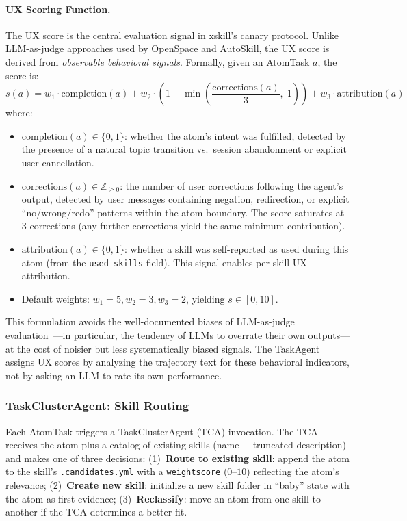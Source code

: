 \documentclass{article}
\begin{document}
\paragraph{UX Scoring Function.} The UX score is the central evaluation signal in xskill's canary protocol. Unlike LLM-as-judge approaches used by OpenSpace and AutoSkill, the UX score is derived from \emph{observable behavioral signals}. Formally, given an AtomTask $a$, the score is:
\begin{equation}
\label{eq:ux}
s(a) = w_1 \cdot \mathrm{completion}(a) + w_2 \cdot \left(1 - \min\!\left(\frac{\mathrm{corrections}(a)}{3},\; 1\right)\right) + w_3 \cdot \mathrm{attribution}(a)
\end{equation}
where:
\begin{itemize}
    \item $\mathrm{completion}(a) \in \{0, 1\}$: whether the atom's intent was fulfilled, detected by the presence of a natural topic transition vs.\ session abandonment or explicit user cancellation.
    \item $\mathrm{corrections}(a) \in \mathbb{Z}_{\geq 0}$: the number of user corrections following the agent's output, detected by user messages containing negation, redirection, or explicit ``no/wrong/redo'' patterns within the atom boundary. The score saturates at 3 corrections (any further corrections yield the same minimum contribution).
    \item $\mathrm{attribution}(a) \in \{0, 1\}$: whether a skill was self-reported as used during this atom (from the \texttt{used\_skills} field). This signal enables per-skill UX attribution.
    \item Default weights: $w_1 = 5, w_2 = 3, w_3 = 2$, yielding $s \in [0, 10]$.
\end{itemize}

This formulation avoids the well-documented biases of LLM-as-judge evaluation~\citep{zheng2024judging}---in particular, the tendency of LLMs to overrate their own outputs---at the cost of noisier but less systematically biased signals. The TaskAgent assigns UX scores by analyzing the trajectory text for these behavioral indicators, not by asking an LLM to rate its own performance.

\subsubsection{TaskClusterAgent: Skill Routing}

Each AtomTask triggers a TaskClusterAgent (TCA) invocation. The TCA receives the atom plus a catalog of existing skills (name + truncated description) and makes one of three decisions: (1)~\textbf{Route to existing skill}: append the atom to the skill's \texttt{.candidates.yml} with a \texttt{weightscore} ($0$--$10$) reflecting the atom's relevance; (2)~\textbf{Create new skill}: initialize a new skill folder in ``baby'' state with the atom as first evidence; (3)~\textbf{Reclassify}: move an atom from one skill to another if the TCA determines a better fit.
\end{document}
